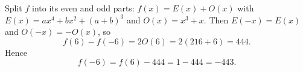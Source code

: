 Split $f$ into its even and odd parts: $f(x)=E(x)+O(x)$ with $E(x)=ax^4+bx^2+(a+b)^3$ and $O(x)=x^3+x$. Then $E(-x)=E(x)$ and $O(-x)=-O(x)$, so
\[f(6)-f(-6)=2O(6)=2\left(216+6\right)=444 .\]
Hence
\[f(-6)=f(6)-444=1-444=\boxed{-443}.\]

